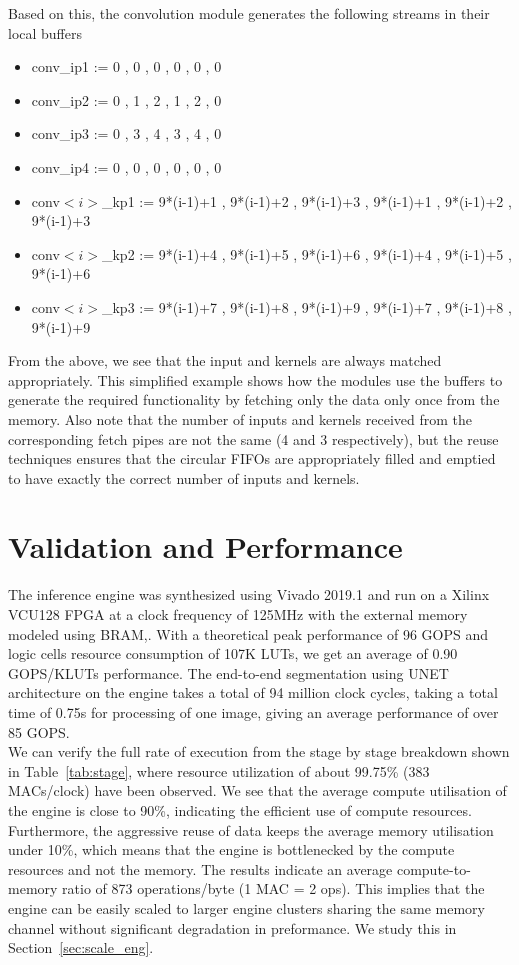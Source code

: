 \documentclass[a4paper,12pt, final]{report}
\begin{document}
Based on this, the convolution module generates the following streams in their local buffers

\begin{itemize}
	\item conv\_ip1 := 0 , 0 , 0 , 0 , 0 , 0
	\item conv\_ip2 := 0 , 1 , 2 , 1 , 2 , 0
	\item conv\_ip3 := 0 , 3 , 4 , 3 , 4 , 0
	\item conv\_ip4 := 0 , 0 , 0 , 0 , 0 , 0
	\item conv$<i>$\_kp1 := 9*(i-1)+1 , 9*(i-1)+2 , 9*(i-1)+3 , 9*(i-1)+1 , 9*(i-1)+2 , 9*(i-1)+3
	\item conv$<i>$\_kp2 := 9*(i-1)+4 , 9*(i-1)+5 , 9*(i-1)+6 , 9*(i-1)+4 , 9*(i-1)+5 , 9*(i-1)+6
	\item conv$<i>$\_kp3 := 9*(i-1)+7 , 9*(i-1)+8 , 9*(i-1)+9 , 9*(i-1)+7 , 9*(i-1)+8 , 9*(i-1)+9
\end{itemize}

From the above, we see that the input and kernels are always matched appropriately. This simplified example shows how the modules use the buffers to generate the required functionality by fetching only the data only once from the memory. Also note that the number of inputs and kernels received from the corresponding fetch pipes are not the same (4 and 3 respectively), but the reuse techniques ensures that the circular FIFOs are appropriately filled and emptied to have exactly the correct number of inputs and kernels.

\section{Validation and Performance}

The inference engine was synthesized using Vivado 2019.1 and run on a Xilinx VCU128 FPGA at a clock frequency of 125MHz with the external memory modeled using BRAM,. With a theoretical peak performance of 96 GOPS and logic cells resource consumption of 107K LUTs, we get an average of 0.90 GOPS/KLUTs performance. The end-to-end segmentation using UNET architecture on the engine takes a total of 94 million clock cycles, taking a total time of 0.75s for processing of one image, giving an average performance of over 85 GOPS.
\\

We can verify the full rate of execution from the stage by stage breakdown shown in Table~\ref{tab:stage}, where resource utilization of about 99.75\% (383 MACs/clock) have been observed. We see that the average compute utilisation of the engine is close to 90\%, indicating the efficient use of compute resources. Furthermore, the aggressive reuse of data keeps the average memory utilisation under 10\%, which means that the engine is bottlenecked by the compute resources and not the memory. The results indicate an average compute-to-memory ratio of 873 operations/byte (1 MAC = 2 ops).  This implies that the engine can be easily scaled to larger engine clusters sharing the same memory channel without significant degradation in preformance. We study this in Section~\ref{sec:scale_eng}. 
\\
\end{document}
